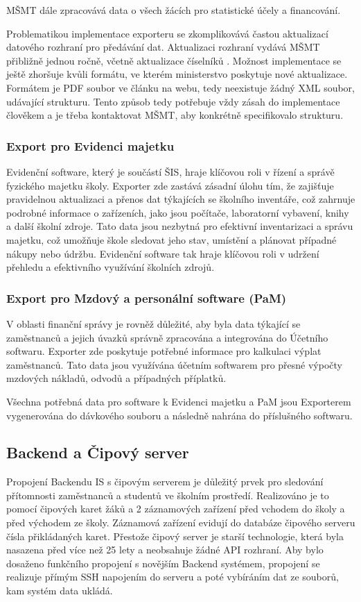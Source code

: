 \documentclass[FM,Proj]{tulthesis}
\begin{document}
MŠMT dále zpracovává data o všech žácích pro statistické účely a financování. 

Problematikou implementace exporteru se zkomplikovává častou aktualizací datového rozhraní
pro předávání dat. Aktualizaci rozhraní vydává MŠMT přibližně jednou ročně, včetně aktualizace
číselníků \cite{msmt-rozhrani-predavani-dat-2023}. Možnost implementace se ještě zhoršuje kvůli formátu,
ve kterém ministerstvo poskytuje nové aktualizace. Formátem je PDF soubor ve článku na webu, tedy
neexistuje žádný XML soubor, udávající strukturu. Tento způsob tedy potřebuje vždy zásah do implementace
člověkem a je třeba kontaktovat MŠMT, aby konkrétně specifikovalo strukturu.

\subsubsection{Export pro Evidenci majetku} \label{section:export-pro-evidenci-majetku} 
Evidenční software, který je součástí ŠIS, hraje klíčovou roli v řízení a správě fyzického
majetku školy. Exporter zde zastává zásadní úlohu tím, že zajišťuje pravidelnou aktualizaci 
a přenos dat týkajících se školního inventáře, což zahrnuje podrobné informace o zařízeních,
jako jsou počítače, laboratorní vybavení, knihy a další školní zdroje. Tato data jsou 
nezbytná pro efektivní inventarizaci a správu majetku, což umožňuje škole sledovat jeho 
stav, umístění a plánovat případné nákupy nebo údržbu. Evidenční software tak hraje
klíčovou roli v udržení přehledu a efektivního využívání školních zdrojů. 

\subsubsection{Export pro Mzdový a personální software (PaM)} \label{section:export-pro-evidenci-pam}
V oblasti finanční správy je rovněž důležité, aby byla data týkající se zaměstnanců a jejich
úvazků správně zpracována a integrována do Účetního softwaru. Exporter zde poskytuje potřebné
informace pro kalkulaci výplat zaměstnanců. Tato data jsou využívána účetním softwarem pro 
přesné výpočty mzdových nákladů, odvodů a případných příplatků.

Všechna potřebná data pro software k Evidenci majetku a PaM jsou Exporterem vygenerována 
do dávkového souboru a následně nahrána do příslušného softwaru. 

\subsection{Backend a Čipový server}
\label{section:backend-a-cipovy-server}
Propojení Backendu IS s čipovým serverem je důležitý prvek pro sledování přítomnosti
zaměstnanců a studentů ve školním prostředí. Realizováno je to pomocí čipových karet žáků
a 2 záznamových zařízení před vchodem do školy a před východem ze školy. Záznamová zařízení
evidují do databáze čipového serveru čísla přikládaných karet. Přestože čipový 
server je starší technologie, která byla nasazena před více než 25 lety a neobsahuje 
žádné API rozhraní. Aby bylo dosaženo funkčního propojení s novějším Backend systémem,
propojení se realizuje přímým SSH napojením do serveru a poté vybíráním dat ze souborů,
kam systém data ukládá.
\end{document}

